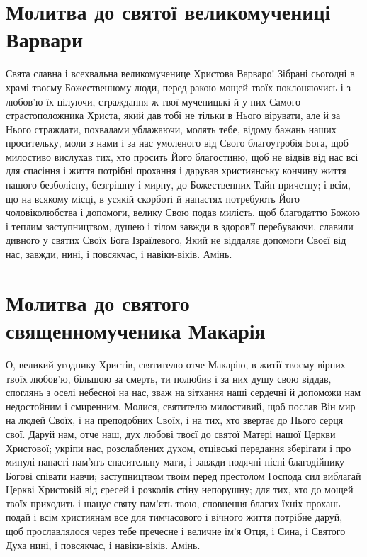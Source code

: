 \documentclass[chapters.tex]{subfiles}
\begin{document}
\section{Молитва до святої великомучениці Варвари}
Свята славна і всехвальна великомученице Христова Варваро! Зібрані сьогодні в храмі твоєму Божественному люди, перед ракою мощей твоїх поклоняючись і з любов’ю їх цілуючи, страждання ж твої мученицькі й у них Самого страстоположника Христа, який дав тобі не тільки в Нього вірувати, але й за Нього страждати, похвалами ублажаючи, молять тебе, відому бажань наших просительку, моли з нами і за нас умоленого від Свого благоутробія Бога, щоб милостиво вислухав тих, хто просить Його благостиню, щоб не відвів від нас всі для спасіння і життя потрібні прохання і дарував християнську кончину життя нашого безболісну, безгрішну і мирну, до Божественних Тайн причетну; і всім, що на всякому місці, в усякій скорботі й напастях потребують Його чоловіколюбства і допомоги, велику Свою подав милість, щоб благодаттю Божою і теплим заступництвом, душею і тілом завжди в здоров’ї перебуваючи, славили дивного у святих Своїх Бога Ізраїлевого, Який не віддаляє допомоги Своєї від нас, завжди, нині, і повсякчас, і навіки-віків. Амінь.

\section{Молитва до святого священномученика Макарія}
О, великий угоднику Христів, святителю отче Макарію, в житії твоєму вірних твоїх любов’ю, більшою за смерть, ти полюбив і за них душу свою віддав, споглянь з оселі небесної на нас, зваж на зітхання наші сердечні й допоможи нам недостойним і смиренним. Молися, святителю милостивий, щоб послав Він мир на людей Своїх, і на преподобних Своїх, і на тих, хто звертає до Нього серця свої. Даруй нам, отче наш, дух любові твоєї до святої Матері нашої Церкви Христової; укріпи нас, розслаблених духом, отцівські передання зберігати і про минулі напасті пам’ять спасительну мати, і завжди подячні пісні благодійнику Богові співати навчи; заступництвом твоїм перед престолом Господа сил виблагай Церкві Христовій від єресей і розколів стіну непорушну; для тих, хто до мощей твоїх приходить і шанує святу пам’ять твою, сповнення благих їхніх прохань подай і всім християнам все для тимчасового і вічного життя потрібне даруй, щоб прославлялося через тебе пречесне і величне ім’я Отця, і Сина, і Святого Духа нині, і повсякчас, і навіки-віків. Амінь.
\end{document}
